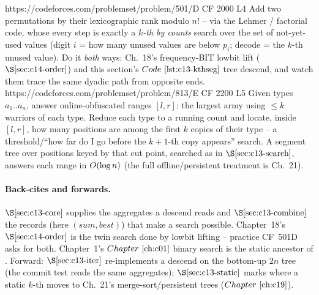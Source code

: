 \begin{practiceset}
    {https://codeforces.com/problemset/problem/501/D}
    {CF 2000 L4}
    {Add two permutations by their lexicographic rank modulo \(n!\) -- via the
     Lehmer / factorial code, whose every step is exactly a \emph{\(k\)-th by
     counts} search over the set of not-yet-used values (digit \(i\) = how many
     unused values are below \(p_i\); decode = the \(k\)-th unused value).
     Do it \emph{both} ways: Ch.~18's frequency-BIT lowbit lift
     (\(\secref{c14-order}\)) and this section's \(\coderef{c13-kthseg}\) tree
     descend, and watch them trace the same dyadic path from opposite ends.}
    {https://codeforces.com/problemset/problem/813/E}
    {CF 2200 L5}
    {Given types \(a_1..a_n\), answer online-obfuscated ranges \([l,r]\): the
     largest army using \(\le k\) warriors of each type.  Reduce each type to a
     running count and locate, inside \([l,r]\), how many positions are among the
     first \(k\) copies of their type -- a threshold/``how far do I go before the
     \(k{+}1\)-th copy appears'' search.  A segment tree over positions keyed by
     that cut point, searched as in \(\secref{c13-search}\), answers each range in
     \(O(\log n)\) (the full offline/persistent treatment is Ch.~21).}
\end{practiceset}

\paragraph{Back-cites and forwards.}
\(\secref{c13-core}\) supplies the aggregates a descend reads and
\(\secref{c13-combine}\) the records (here \((\mathit{sum},\mathit{best})\)) that
make a search possible.  Chapter~18's \(\secref{c14-order}\) is the twin search
done by lowbit lifting -- practice CF~501D asks for both.  Chapter~1's
\(\chref{c01}\) binary search is the static ancestor of .
Forward: \(\secref{c13-iter}\) re-implements a descend on the bottom-up \(2n\)
tree (the commit test reads the same aggregates); \(\secref{c13-static}\) marks
where a static \(k\)-th moves to Ch.~21's merge-sort/persistent trees
(\(\chref{c19}\)).

